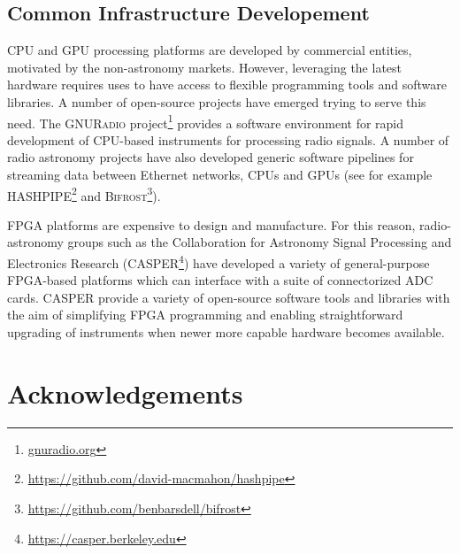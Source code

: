 \documentclass{ws-rv961x669}
\begin{document}
\subsection{Common Infrastructure Developement}

CPU and GPU processing platforms are developed by commercial entities, motivated by the non-astronomy markets. However, leveraging the latest hardware requires uses to have access to flexible programming tools and software libraries. A number of open-source projects have emerged trying to serve this need.
The \textsc{GNURadio} project\footnote{\url{gnuradio.org}} provides a software environment for rapid development of CPU-based instruments for processing radio signals.
A number of radio astronomy projects have also developed generic software pipelines for streaming data between Ethernet networks, CPUs and GPUs (see for example \textsc{HASHPIPE}\footnote{\url{https://github.com/david-macmahon/hashpipe}} and \textsc{Bifrost}\footnote{\url{https://github.com/benbarsdell/bifrost}}).

FPGA platforms are expensive to design and manufacture. For this reason, radio-astronomy groups such as the Collaboration for Astronomy Signal Processing and Electronics Research (CASPER\footnote{\url{https://casper.berkeley.edu}}) have developed a variety of general-purpose FPGA-based platforms which can interface with a suite of connectorized ADC cards.
CASPER provide a variety of open-source software tools and libraries with the aim of simplifying FPGA programming and enabling straightforward upgrading of instruments when newer more capable hardware becomes available.



\section{Acknowledgements}
\end{document}
